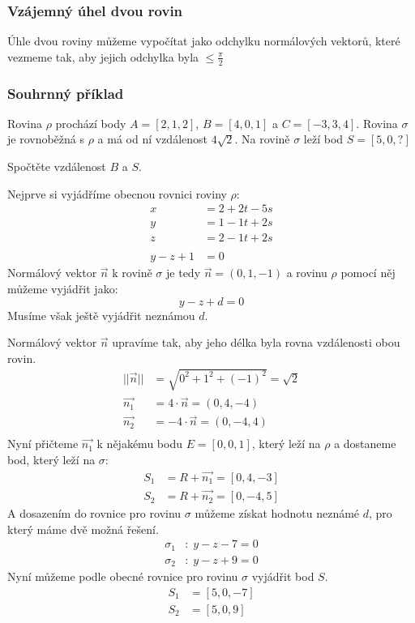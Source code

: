 \subsubsection{Vzájemný úhel dvou rovin}
Úhle dvou roviny můžeme vypočítat jako odchylku
normálových vektorů, které vezmeme tak, aby jejich odchylka
byla $\leq \frac{\pi}{2}$

\subsubsection{Souhrnný příklad}
\begin{example}
    Rovina $\rho$ prochází body $A = [2, 1, 2]$, $B = [4, 0, 1]$ a $C = [-3, 3, 4]$.
    Rovina $\sigma$ je rovnoběžná s $\rho$ a má od ní vzdálenost $4\sqrt{2}$.
    Na rovině $\sigma$ leží bod $S = [5, 0, ?]$

    Spočtěte vzdálenost $B$ a $S$.

    Nejprve si vyjádříme obecnou rovnici roviny $\rho$:
    \begin{align*}
        x &= 2 + 2t -5s \\
        y &= 1 - 1t + 2s\\
        z &= 2 - 1t + 2s\\
        \\
        y - z +1 &= 0
    \end{align*}
    Normálový vektor $\vec{n}$ k rovině $\sigma$ je tedy $\vec{n} = (0, 1, -1)$ a
    rovinu $\rho$ pomocí něj můžeme vyjádřit jako:
    $$y - z + d = 0$$
    Musíme však ještě vyjádřit neznámou $d$.

    Normálový vektor $\vec{n}$ upravíme tak, aby jeho délka byla rovna vzdálenosti obou rovin.
    \begin{align*}
        ||\vec{n}|| &= \sqrt{0^2 + 1^2 + (-1)^2} = \sqrt{2}\\
        \vec{n_1} &= 4 \cdot \vec{n} = (0, 4, -4)\\
        \vec{n_2} &= -4 \cdot \vec{n} = (0, -4, 4)\\
    \end{align*}
    Nyní přičteme $\vec{n_1}$ k nějakému bodu $E = [0, 0, 1]$, který leží na $\rho$ a dostaneme bod,
    který leží na $\sigma$:
    \begin{align*}
        S_1 &= R + \vec{n_1} = [0, 4, -3]\\
        S_2 &= R + \vec{n_2} = [0, -4, 5]
    \end{align*}
    A dosazením do rovnice pro rovinu $\sigma$ můžeme získat hodnotu neznámé $d$, pro
    který máme dvě možná řešení.
    \begin{align*}
       \sigma_1&:\; y - z - 7 = 0\\
       \sigma_2&:\; y - z + 9 = 0
    \end{align*}
    Nyní můžeme podle obecné rovnice pro rovinu $\sigma$ vyjádřit bod $S$.
    \begin{align*}
        S_1 &= [5, 0, -7]\\
        S_2 &= [5, 0, 9]
    \end{align*}


\end{example}
